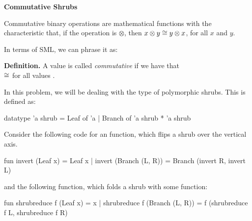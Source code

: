 \documentclass[addpoints,12pt]{exam}
\begin{document}
\begin{questions}

\newpage
{}

\textbf{Commutative Shrubs}

Commutative binary operations are mathematical functions with the characteristic
that, if the operation is $\otimes$, then $x \otimes y \cong y \otimes x$, for
all $x$ and $y$.

In terms of SML, we can phrase it as:

\textbf{Definition.} A value  is called \textit{commutative} if
we have that \\
 $\cong$  for all values .

In this problem, we will be dealing with the type of polymorphic shrubs. This is
defined as:
\begin{codeblock}
  datatype 'a shrub =
      Leaf of 'a
    | Branch of 'a shrub * 'a shrub
\end{codeblock}

Consider the following code for an  function,
which flips a shrub over the vertical axis.
\begin{codeblock}
  fun invert (Leaf x) = Leaf x
    | invert (Branch (L, R)) =
        Branch (invert R, invert L)
\end{codeblock}
and the following  function, which folds a shrub with
some function:
\begin{codeblock}
  fun shrubreduce f (Leaf x) = x
    | shrubreduce f (Branch (L, R)) =
        f (shrubreduce f L, shrubreduce f R)
\end{codeblock}


\end{questions}
\end{document}
